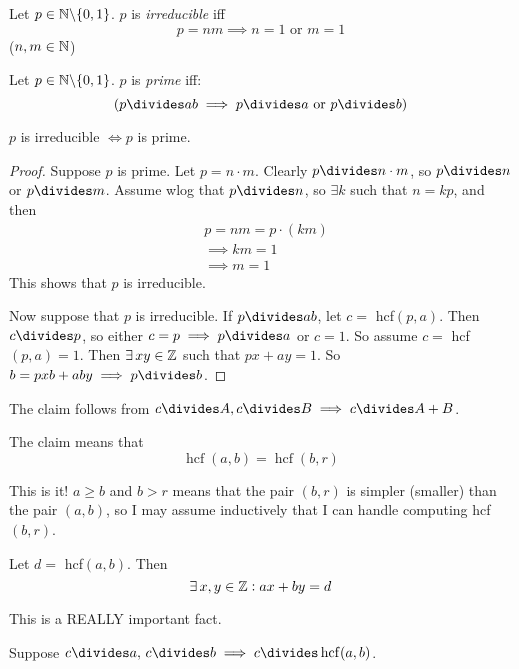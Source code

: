 \documentclass[twoside]{scrartcl}
\DeclareMathOperator{\hcf}{hcf}
\begin{document}
\begin{definition}
Let $p \in\mathbb{N}\backslash \{0,1\}$. $p$ is \emph{irreducible} iff
\[p = nm \implies n = 1 \text{ or } m = 1\]
($n,m \in\mathbb{N}$)
\end{definition}

\begin{definition}
Let $p\in\mathbb{N} \backslash \{0,1\}$. $p$ is \emph{prime} iff:
\[(p \divides ab \implies p \divides a \text{ or } p\divides b)\]	
\end{definition}

\begin{proposition}
$p$ is irreducible $\iff p$ is prime.	
\end{proposition}

\begin{proof}
Suppose $p$ is prime. Let $ p = n \cdot m$. Clearly $p \divides n\cdot m$, so $p \divides n$ or $p \divides m$. Assume wlog that $p \divides n$, so $\exists k$ such that $n = kp$, and then 
\[
\begin{aligned}
 & p = nm = p\cdot(km)\\
  &\implies km =1\\
  &\implies m =1
\end{aligned}
\]
This shows that $p$ is irreducible. 

Now suppose that $p$ is irreducible. If $p \divides ab$, let $c = $ hcf$(p,a)$. Then $c \divides p$, so either $c = p \implies p \divides a$ or $c = 1$. So assume $c = $ hcf$(p,a) = 1$. Then $\exists\, xy \in \mathbb{Z}$ such that $px + ay = 1$. So $b = pxb + aby \implies p \divides b$. 
\end{proof}

\begin{remark}
The claim follows from $c \divides A, c \divides B \implies c \divides A + B$.	
\end{remark}

The claim means that 
\[\hcf(a,b) = \hcf(b,r)\]

This is it! $a \geq b$ and $b > r$ means that the pair $(b,r)$ is simpler (smaller) than the pair $(a,b)$, so I may assume inductively that I can handle computing hcf$(b,r)$. \\

\begin{theorem}
Let $d =$ hcf$(a,b)$. Then
\[\exists\,x,y \in\mathbb{Z}: ax + by = d\]	
\end{theorem}
This is a REALLY important fact.

\begin{corollary}
Suppose $c \divides a,\, c\divides b \implies c\divides \hcf(a,b)$.	
\end{corollary}
\end{document}
